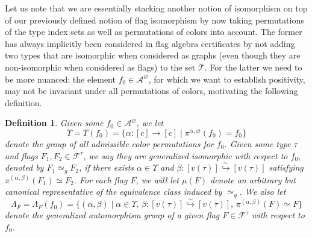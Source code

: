 \documentclass[a4paper,11pt]{article}
\newtheorem{definition}[theorem]{Definition}
\numberwithin{equation}{section}
\newcommand{\mA}{\mathcal{A}}
\newcommand{\mF}{\mathcal{F}}
\newcommand{\mT}{\mathcal{T}}
\begin{document}
Let us note that we are essentially stacking another notion of isomorphism on top of our previously defined notion of flag isomorphism by now taking permutations of the type index sets as well as permutations of colors into account. The former has always implicitly been considered in flag algebra certificates by not adding two types that are isomorphic when considered as graphs (even though they are non-isomorphic when considered as flags) to the set $\mT$.  For the latter we need to be more nuanced: the element $f_0 \in \mA^\varnothing$, for which we want to establish positivity, may not be invariant under all permutations of colors, motivating the following definition.
%
\begin{definition}
    Given some $f_0\in\mA^\varnothing$, we let 
    \begin{equation*}
        \Upsilon = \Upsilon(f_0) = \{ \alpha:[c]\to[c] \mid \pi^{\alpha,\varnothing}(f_0) = f_0 \}
    \end{equation*}
    denote the group of all \emph{admissible color permutations} for $f_0$. Given some type $\tau$ and flags $F_1, F_2 \in \mF^\tau$, we say they are \emph{generalized isomorphic} with respect to $f_0$, denoted by $F_1 \simeq_g F_2$, if there exists $\alpha \in \Upsilon$ and $\beta: [v(\tau)] \overset{\sim}{\hookrightarrow} [v(\tau)]$ satisfying $\pi^{(\alpha,\beta)}(F_1) \simeq F_2$. For each flag $F$, we will let $\mu(F)$ denote an arbitrary but canonical representative of the equivalence class induced by $\simeq_g$.  We also let
    \begin{equation*}
        \Lambda_F =  \Lambda_F(f_0) = \{ (\alpha,\beta) \mid \alpha \in \Upsilon, \, \beta: [v(\tau)]\overset{\sim}{\hookrightarrow} [v(\tau)], \, \pi^{(\alpha,\beta)}(F) \simeq F \}
    \end{equation*}
    denote the \emph{generalized automorphism group} of a given flag $F \in \mF^\tau$ with respect to $f_0$.
\end{definition}

%

%
\end{document}
